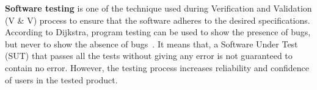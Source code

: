 


{\textbf {Software testing}} is one of the technique used during Verification and Validation (V \& V) process to ensure that the software adheres to the desired specifications. According to Dijkstra, program testing can be used to show the presence of bugs, but never to show the absence of bugs~\cite{Dijkstra1972}. It means that, a Software Under Test (SUT) that passes all the tests without giving any error is not guaranteed to contain no error. However, the testing process increases reliability and confidence of users in the tested product.

